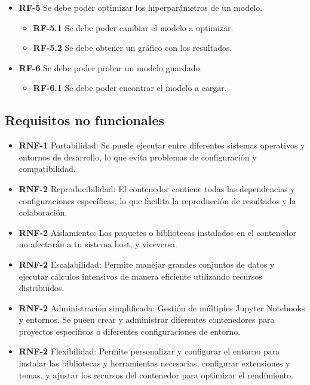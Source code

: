 \begin{itemize}
    \item \textbf{RF-5} Se debe poder optimizar los hiperparámetros de un modelo.
        \begin{itemize}
            \item \textbf{RF-5.1} Se debe poder cambiar el modelo a optimizar.
            \item \textbf{RF-5.2} Se debe obtener un gráfico con los resultados.
        \end{itemize}

    \item \textbf{RF-6} Se debe poder probar un modelo guardado.
        \begin{itemize}
            \item \textbf{RF-6.1} Se debe poder encontrar el modelo a cargar.
        \end{itemize}
\end{itemize}

\subsection{Requisitos no funcionales}

\begin{itemize}
    \item \textbf{RNF-1} Portabilidad: Se puede ejecutar entre diferentes sistemas operativos y entornos de desarrollo, lo que evita problemas de configuración y compatibilidad.
    \item \textbf{RNF-2} Reproducibilidad: El contenedor contiene todas las dependencias y configuraciones específicas, lo que facilita la reproducción de resultados y la colaboración.
    \item \textbf{RNF-2} Aislamiento: Los paquetes o bibliotecas instalados en el contenedor no afectarán a tu sistema host, y viceversa.
    \item \textbf{RNF-2} Escalabilidad: Permite manejar grandes conjuntos de datos y ejecutar cálculos intensivos de manera eficiente utilizando recursos distribuidos.
    \item \textbf{RNF-2} Administración simplificada: Gestión de múltiples Jupyter Notebooks y entornos. Se pueen crear y administrar diferentes contenedores para proyectos específicos o diferentes configuraciones de entorno.
    \item \textbf{RNF-2} Flexibilidad: Permite personalizar y configurar el entorno para instalar las bibliotecas y herramientas necesarias, configurar extensiones y temas, y ajustar los recursos del contenedor para optimizar el rendimiento.
\end{itemize}
\newpage

